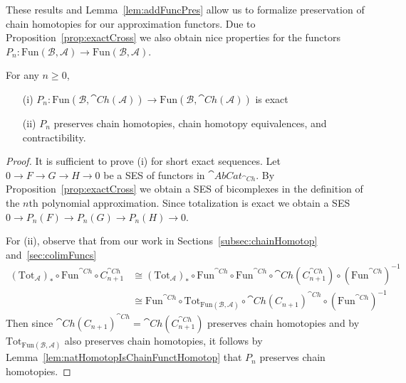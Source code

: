 These results and Lemma~\ref{lem:addFuncPres} allow us to formalize preservation of chain homotopies for our approximation functors. Due to Proposition~\ref{prop:exactCross} we also obtain nice properties for the functors $P_n:\text{Fun}(\mathcal{B},\mathcal{A})\rightarrow \text{Fun}(\mathcal{B},\mathcal{A})$.

\begin{prop}[label=prop:exactPol]
    For any $n \geq 0$,
    \begin{itemize}
        \item[(i)] $P_n:\text{Fun}(\mathcal{B},\cat{Ch}(\mathcal{A}))\rightarrow \text{Fun}(\mathcal{B},\cat{Ch}(\mathcal{A}))$ is exact
        \item[(ii)] $P_n$ preserves  chain homotopies, chain homotopy equivalences, and contractibility. 
    \end{itemize}
\end{prop}
\begin{proof}
    It is sufficient to prove (i) for short exact sequences. Let $0 \rightarrow F\rightarrow G\rightarrow H\rightarrow 0$ be a SES of functors in $\cat{AbCat}_{\cat{Ch}}$. By Proposition~\ref{prop:exactCross} we obtain a SES of bicomplexes in the definition of the $n$th polynomial approximation. Since totalization is exact we obtain a SES $0 \rightarrow P_n(F)\rightarrow P_n(G)\rightarrow P_n(H)\rightarrow 0$. 
    
    \vspace{10pt}
    
    For (ii), observe that from our work in Sections~\ref{subsec:chainHomotop} and~\ref{sec:colimFuncs}
    \begin{align*}
        (\text{Tot}_{\mathcal{A}})_*\circ \text{Fun}^{\cat{Ch}}\circ C_{n+1}^{\cat{Ch}} &\cong (\text{Tot}_{\mathcal{A}})_*\circ \text{Fun}^{\cat{Ch}}\circ \text{Fun}^{\cat{Ch}} \circ \cat{Ch}(C_{n+1}^{\cat{Ch}})  \circ (\text{Fun}^{\cat{Ch}})^{-1} \\
        &\cong \text{Fun}^{\cat{Ch}}\circ \text{Tot}_{\text{Fun}(\mathcal{B},\mathcal{A})}\circ \cat{Ch}(C_{n+1})^{\cat{Ch}}\circ (\text{Fun}^{\cat{Ch}})^{-1}
    \end{align*}
    Then since $\cat{Ch}(C_{n+1})^{\cat{Ch}}=\cat{Ch}(C_{n+1}^{\cat{Ch}})$ preserves chain homotopies and by~\cite[12.18]{StacksProject} $\text{Tot}_{\text{Fun}(\mathcal{B},\mathcal{A})}$ also preserves chain homotopies, it follows by Lemma~\ref{lem:natHomotopIsChainFunctHomotop} that $P_n$ preserves  chain homotopies. 
\end{proof}

